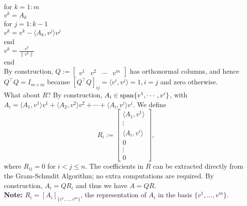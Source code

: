         for $k=1:m$\\
        \indent\hspace{4ex}$v^k=A_k$\\
        \indent\hspace{4ex}for $j=1:k-1$\\
        \indent\hspace{8ex}$v^k=v^k-\langle A_k,v^j\rangle v^j$\\
        \indent\hspace{4ex}end\\
        \indent\hspace{4ex}$v^k =\frac{v^k}{\|v^k\|}$\\
        end\\
        
 By construction, $Q:= \left[\begin{array}{cccc}v^1 &v^2 & \cdots & v^m\end{array}\right]$ has orthonormal columns, and hence $Q^\top Q=I_{m \times m}$ because $[Q^\top Q]_{ij}=\langle v^i, v^j \rangle=1, i = j$ and zero otherwise.\\

    What about $R$? By construction, $A_i\in \mathrm{span} \{ v^1,\dotsb,v^i \}$, with
    $A_i=\langle A_1,v^1\rangle v^1+\langle A_2,v^2\rangle v^2+\dotsb+\langle A_i,v^i\rangle v^i$. 
    We define 
    $$R_i:=\begin{bmatrix}
        \langle A_1,v^1\rangle\\
        \vdots\\
        \langle A_i,v^i\rangle\\
        0\\
        \vdots\\
        0
    \end{bmatrix},$$ where $R_{ij}=0$ for $i < j \le n$. The coefficients in $R$ can be extracted directly from the Gram-Schmdit Algorithm; no extra computations are required. By construction, $ A_i=Q R_i$ and thus we have $A = QR$.\\
    
    \textbf{Note:} $R_i = [A_i]_{\{v^1, \ldots, v^m\}}$, the representation of $A_i$ in the basis $\{v^1, \ldots, v^m\}$.

\Qed
    
